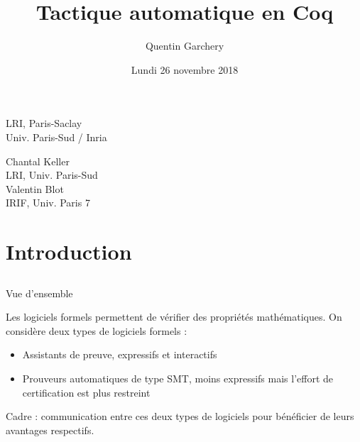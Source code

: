 \documentclass{beamer}
\title[Audition]{Tactique automatique en Coq}
\author{Quentin Garchery}
\date{Lundi 26 novembre 2018}
\begin{document}
    \begin{frame}
      \begin{center}
        \maketitle
        \normalsize{LRI, Paris-Saclay\\
          Univ. Paris-Sud / Inria }
        \vspace{1mm}


        \vspace{1mm}

        \begin{multicols}{2}
          \normalsize Chantal Keller \\
          \scriptsize LRI, Univ. Paris-Sud \\

          \normalsize Valentin Blot \\
          \scriptsize IRIF, Univ. Paris 7
        \end{multicols}

      \end{center}
    \end{frame}



    \section{Introduction}

    \subsection{}
    \begin{frame}{Vue d'ensemble}


      Les logiciels formels permettent de vérifier des propriétés mathématiques. On considère deux types de logiciels formels :
      \begin{itemize}
      \item Assistants de preuve, expressifs et interactifs
      \item Prouveurs automatiques de type SMT, moins expressifs mais l'effort de certification est plus restreint

      \end{itemize}

      \vspace{0.5cm}
      Cadre : communication entre ces deux types de logiciels pour bénéficier de leurs avantages respectifs.

    \end{frame}
\end{document}
